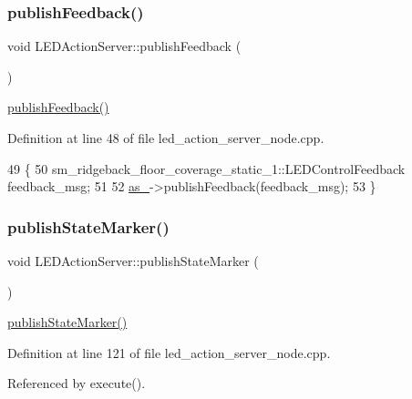 \subsubsection{\texorpdfstring{publish\+Feedback()}{publishFeedback()}\hspace{0.1cm}{\footnotesize\ttfamily [4/4]}}
{\footnotesize\ttfamily void L\+E\+D\+Action\+Server\+::publish\+Feedback (\begin{DoxyParamCaption}{ }\end{DoxyParamCaption})\hspace{0.3cm}{\ttfamily [inline]}}

\hyperlink{classLEDActionServer_a25c93d4e7ecdacbb4f5b090d7789aa36}{publish\+Feedback()} 

Definition at line 48 of file led\+\_\+action\+\_\+server\+\_\+node.\+cpp.


\begin{DoxyCode}
49 \{
50     sm\_ridgeback\_floor\_coverage\_static\_1::LEDControlFeedback feedback\_msg;
51     
52     \hyperlink{classLEDActionServer_a61d21c77642081acf017d4ebd65b2de0}{as\_}->publishFeedback(feedback\_msg);
53 \}
\end{DoxyCode}
\mbox{\label{classLEDActionServer_a73bb754ac2347c50660624ad92315895}} 
\subsubsection{\texorpdfstring{publish\+State\+Marker()}{publishStateMarker()}\hspace{0.1cm}{\footnotesize\ttfamily [1/4]}}
{\footnotesize\ttfamily void L\+E\+D\+Action\+Server\+::publish\+State\+Marker (\begin{DoxyParamCaption}{ }\end{DoxyParamCaption})\hspace{0.3cm}{\ttfamily [inline]}}

\hyperlink{classLEDActionServer_a73bb754ac2347c50660624ad92315895}{publish\+State\+Marker()} 

Definition at line 121 of file led\+\_\+action\+\_\+server\+\_\+node.\+cpp.



Referenced by execute().


